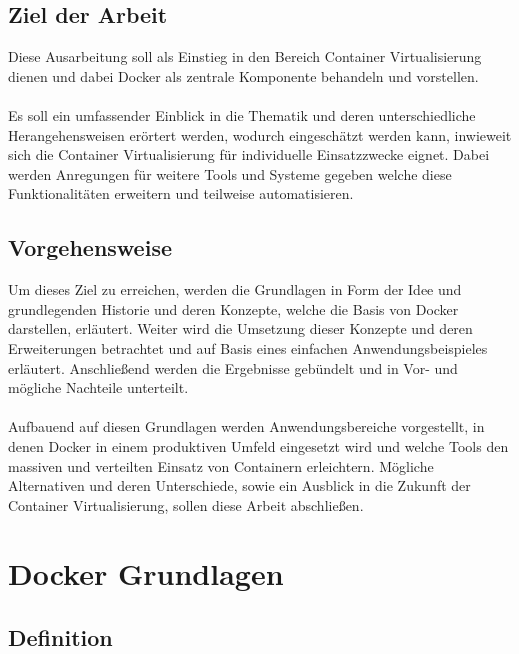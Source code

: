 \documentclass[12pt,toc=bib,toc=listof]{scrreprt}
\begin{document}

\section{Ziel der Arbeit} %
\label{sec:ziel_der_arbeit}

Diese Ausarbeitung soll als Einstieg in den Bereich Container Virtualisierung dienen und dabei Docker als zentrale Komponente behandeln und vorstellen.\\
\\
Es soll ein umfassender Einblick in die Thematik und deren unterschiedliche Herangehensweisen erörtert werden, wodurch eingeschätzt werden kann, inwieweit sich die Container Virtualisierung für individuelle Einsatzzwecke eignet.
Dabei werden Anregungen für weitere Tools und Systeme gegeben welche diese Funktionalitäten erweitern und teilweise automatisieren. 


\section{Vorgehensweise} %
\label{sec:vorgehensweise}

Um dieses Ziel zu erreichen, werden die Grundlagen in Form der Idee und grundlegenden Historie und deren Konzepte, welche die Basis von Docker darstellen, erläutert.
Weiter wird die Umsetzung dieser Konzepte und deren Erweiterungen betrachtet und auf Basis eines einfachen Anwendungsbeispieles erläutert.
Anschließend werden die Ergebnisse gebündelt und in Vor- und mögliche Nachteile unterteilt.\\
\\
Aufbauend auf diesen Grundlagen werden Anwendungsbereiche vorgestellt, in denen Docker in einem produktiven Umfeld eingesetzt wird und welche Tools den massiven und verteilten Einsatz von Containern erleichtern.
Mögliche Alternativen und deren Unterschiede, sowie ein Ausblick in die Zukunft der Container Virtualisierung, sollen diese Arbeit abschließen.




\chapter{Docker Grundlagen} %
\label{sec:grundlagen}

\section{Definition}
\end{document}

